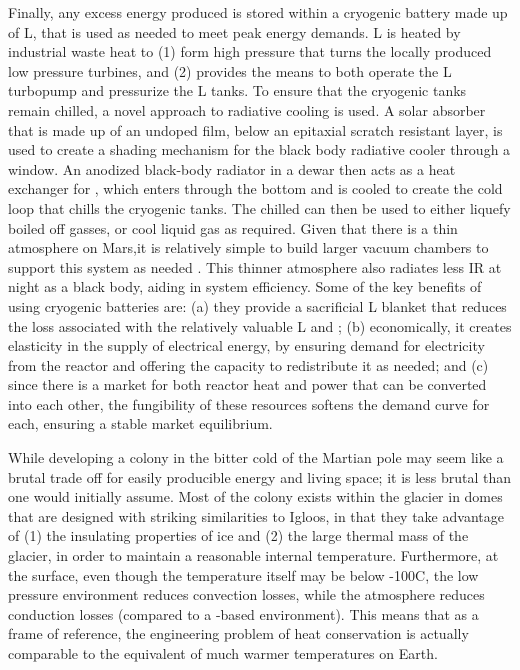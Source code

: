 \documentclass[fleqn,10pt]{Stylesheet} %
\begin{document}
Finally, any excess energy produced is stored within a cryogenic battery \cite{Hogberg2018} made up of L, that is used as needed to meet peak energy demands. L is heated by industrial waste heat to (1) form high pressure  that turns the locally produced low pressure turbines, and (2) provides the means to both operate the L turbopump and pressurize the L tanks. To ensure that the cryogenic tanks remain chilled, a novel approach to radiative cooling is used. A solar absorber that is made up of an undoped  film, below an epitaxial  scratch resistant layer, is used to create a shading mechanism for the black body radiative cooler through a  window. An anodized black-body radiator in a dewar then acts as a heat exchanger for , which enters through the bottom and is cooled to create the cold loop that chills the cryogenic tanks. The chilled  can then be used to either liquefy boiled off gasses, or cool liquid gas as required. Given that there is a thin atmosphere on Mars,it is relatively simple to build larger vacuum chambers to support this system as needed \cite{Chen2019}. This thinner atmosphere also radiates less IR at night as a black body, aiding in system efficiency. Some of the key benefits of using cryogenic batteries are: (a) they provide a sacrificial L blanket that reduces the loss associated with the relatively valuable L and ; (b) economically, it creates elasticity in the supply of electrical energy, by ensuring demand for electricity from the reactor and offering the capacity to redistribute it as needed; and (c) since there is a market for both reactor heat and power that can be converted into each other, the fungibility of these resources softens the demand curve for each, ensuring a stable market equilibrium.

While developing a colony in the bitter cold of the Martian pole may seem like a brutal trade off for easily producible energy and living space; it is less brutal than one would initially assume. Most of the colony exists within the glacier in domes that are designed with striking similarities to Igloos, in that they take advantage of (1) the insulating properties of ice and (2) the large thermal mass of the glacier, in order to maintain a reasonable internal temperature. Furthermore, at the surface, even though the temperature itself may be below -100\degree{}C, the low pressure environment reduces convection losses, while the  atmosphere reduces conduction losses (compared to a -based environment). This means that as a frame of reference, the engineering problem of heat conservation is actually comparable to the equivalent of much warmer temperatures on Earth.
\end{document}
